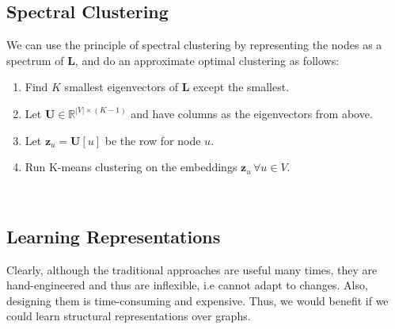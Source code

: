 \subsection{Spectral Clustering}
We can use the principle of spectral clustering by representing the nodes as a spectrum of $\mathbf{L}$, and do an approximate optimal clustering as follows: \\
    \begin{tcolorbox}[space to upper,
	skin=bicolor,
	colbacklower=black!75,
	collower=white,
	title={General Spectral Clustering Algorithm},
	nobeforeafter,
	bottom=0mm,
	height=4.5cm,
	width=4.1in
	]
	\begin{enumerate}
		\item Find $K$ smallest eigenvectors of $\mathbf{L}$ except the smallest.
		\item Let $\mathbf{U} \in\mathbb{R}^{|V| \times (K-1)}$ and have columns as the eigenvectors from above.
		\item Let $\mathbf{z}_u = \mathbf{U}[u]$ be the row for node $u$.
		\item Run K-means clustering on the embeddings $\mathbf{z}_u \, \forall u\in V$.
	\end{enumerate}
\end{tcolorbox}\\
\subsection{Learning Representations}
Clearly, although the traditional approaches are useful many times, they are hand-engineered and thus are inflexible, i.e cannot adapt to changes. Also, designing them is time-consuming and expensive. Thus, we would benefit if we could learn structural representations over graphs.

